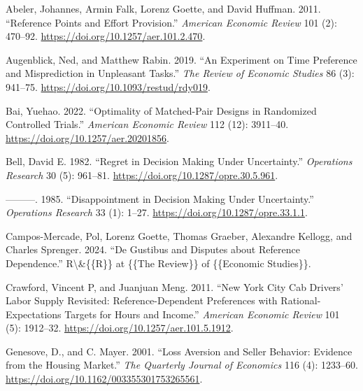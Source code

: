 \documentclass[
  12,
  letterpaper,
  DIV=11,
  numbers=noendperiod]{scrartcl}
\newlength{\cslhangindent}
\newenvironment{CSLReferences}[2] %
 {\begin{list}{}{%
  \setlength{\itemindent}{0pt}
  \setlength{\leftmargin}{0pt}
  \setlength{\parsep}{0pt}
  \ifodd #1
   \setlength{\leftmargin}{\cslhangindent}
   \setlength{\itemindent}{-1\cslhangindent}
  \fi
  \setlength{\itemsep}{#2\baselineskip}}}
 {\end{list}}
\begin{document}
\label{refs}
\begin{CSLReferences}{1}{0}
Abeler, Johannes, Armin Falk, Lorenz Goette, and David Huffman. 2011.
{``Reference {Points} and {Effort Provision}.''} \emph{American Economic
Review} 101 (2): 470--92. \url{https://doi.org/10.1257/aer.101.2.470}.

Augenblick, Ned, and Matthew Rabin. 2019. {``An {Experiment} on {Time
Preference} and {Misprediction} in {Unpleasant Tasks}.''} \emph{The
Review of Economic Studies} 86 (3): 941--75.
\url{https://doi.org/10.1093/restud/rdy019}.

Bai, Yuehao. 2022. {``Optimality of {Matched-Pair Designs} in
{Randomized Controlled Trials}.''} \emph{American Economic Review} 112
(12): 3911--40. \url{https://doi.org/10.1257/aer.20201856}.

Bell, David E. 1982. {``Regret in {Decision Making} Under
{Uncertainty}.''} \emph{Operations Research} 30 (5): 961--81.
\url{https://doi.org/10.1287/opre.30.5.961}.

---------. 1985. {``Disappointment in {Decision Making Under
Uncertainty}.''} \emph{Operations Research} 33 (1): 1--27.
\url{https://doi.org/10.1287/opre.33.1.1}.

Campos-Mercade, Pol, Lorenz Goette, Thomas Graeber, Alexandre Kellogg,
and Charles Sprenger. 2024. {``De {Gustibus} and {Disputes} about
{Reference Dependence}.''} R\textbackslash\&\{\{R\}\} at \{\{The
Review\}\} of \{\{Economic Studies\}\}.

Crawford, Vincent P, and Juanjuan Meng. 2011. {``New {York City Cab
Drivers}' {Labor Supply Revisited}: {Reference-Dependent Preferences}
with {Rational-Expectations Targets} for {Hours} and {Income}.''}
\emph{American Economic Review} 101 (5): 1912--32.
\url{https://doi.org/10.1257/aer.101.5.1912}.

Genesove, D., and C. Mayer. 2001. {``Loss {Aversion} and {Seller
Behavior}: {Evidence} from the {Housing Market}.''} \emph{The Quarterly
Journal of Economics} 116 (4): 1233--60.
\url{https://doi.org/10.1162/003355301753265561}.


\end{CSLReferences}
\end{document}
